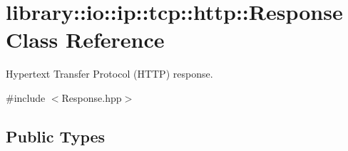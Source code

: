 \hypertarget{classlibrary_1_1io_1_1ip_1_1tcp_1_1http_1_1_response}{}\section{library\+:\+:io\+:\+:ip\+:\+:tcp\+:\+:http\+:\+:Response Class Reference}
\label{classlibrary_1_1io_1_1ip_1_1tcp_1_1http_1_1_response}


Hypertext Transfer Protocol (H\+T\+TP) response.  




{\ttfamily \#include $<$Response.\+hpp$>$}

\subsection*{Public Types}
